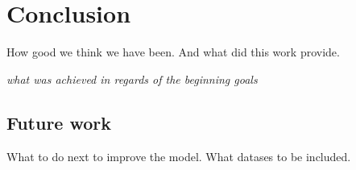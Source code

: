\chapter{Conclusion}

How good we think we have been. And what did this work provide.

\textit{what was achieved in regards of the beginning goals}

\section{Future work}

What to do next to improve the model. What datases to be included.
